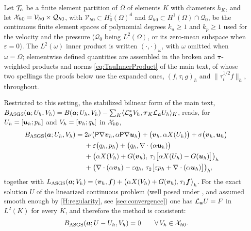 Let $\mathcal{T}_h$ be a finite element partition of $\overline{\Omega}$ of elements $K$ with
diameters $h_K$, and let
$\mathcal{X}_{h0} = \mathcal{V}_{h0}\times\mathcal{Q}_{h0}$, with
$\mathcal{V}_{h0}\subset H_0^1(\Omega)^d$ and
$\mathcal{Q}_{h0}\subset H^1(\Omega)\cap\mathcal{Q}_0$, be the continuous finite element
spaces of polynomial degrees $k_u\ge 1$ and $k_p\ge 1$ used for the velocity and the
pressure ($\mathcal{Q}_0$ being $L^2(\Omega)$, or its zero-mean subspace when
$\varepsilon=0$). The $L^2(\omega)$ inner product is written
$(\cdot,\cdot)_\omega$, with $\omega$ omitted when $\omega=\Omega$; elementwise defined
quantities are assembled in the broken and $\boldsymbol{\tau}${\hyp}weighted products and norms
\cref{eq:TauInnerProduct} of the main text, of whose two spellings the proofs below use the
expanded ones, $(f,\tau_i\,g)_h$ and $\bigl\lVert\tau_i^{1/2}f\bigr\rVert_h$, throughout.

Restricted to this setting, the stabilized bilinear form of the main text,
$B_{\mathrm{ASGS}} (\boldsymbol{a}; U_h,V_h)=B(\boldsymbol{a}; U_h,V_h)-\sum_K \langle \mathcal{L}_{\boldsymbol{a}}^{*} V_h,
\boldsymbol{\tau}_K \mathcal{L}_{\boldsymbol{a}} U_h\rangle_K$, reads, for
$U_h=[\boldsymbol{u}_h;p_h]$ and $V_h=[\boldsymbol{v}_h;q_h]$ in $\mathcal{X}_{h0}$,
\begin{equation}\label{eq:Bstab}
\begin{aligned}
  B_{\mathrm{ASGS}} (\boldsymbol{a}; U_h,V_h)
  ={}& 2\nu\bigl(\mathsf{P}\nabla\boldsymbol{v}_h,\alpha\mathsf{P}\nabla\boldsymbol{u}_h\bigr)
     + \bigl(\boldsymbol{v}_h,\alpha X(U_h)\bigr)
     + \sigma\bigl(\boldsymbol{v}_h,\boldsymbol{u}_h\bigr) \\
   & + \varepsilon\bigl(q_h,p_h\bigr)
     + \bigl(q_h,\nabla\cdot(\alpha\boldsymbol{u}_h)\bigr) \\
   & + \bigl(\alpha X(V_h)+G(\boldsymbol{v}_h),\,
       \tau_1\bigl[\alpha X(U_h)-G(\boldsymbol{u}_h)\bigr]\bigr)_h \\
   & + \bigl(\nabla\cdot(\alpha\boldsymbol{v}_h)-\varepsilon q_h,\,
       \tau_2\bigl[\varepsilon p_h+\nabla\cdot(\alpha\boldsymbol{u}_h)\bigr]\bigr)_h ,
\end{aligned}
\end{equation}
together with
$L_{\mathrm{ASGS}}(\boldsymbol{a};V_h)=(\boldsymbol{v}_h,\boldsymbol{f})
 +\bigl(\alpha X(V_h)+G(\boldsymbol{v}_h),\tau_1\boldsymbol{f}\bigr)_h$.
For the exact solution $U$ of the linearized continuous problem (well posed under
, and assumed smooth enough by \cref{H:regularity},
see \cref{sec:convergence}) one has $\mathcal{L}_{\boldsymbol{a}}U=F$ in $L^2(K)$ for every $K$, and
therefore the method is consistent:
\begin{equation}\label{eq:consistency}
  B_{\mathrm{ASGS}} (\boldsymbol{a}; U-U_h, V_h) = 0 \qquad \forall\, V_h\in\mathcal{X}_{h0} .
\end{equation}

